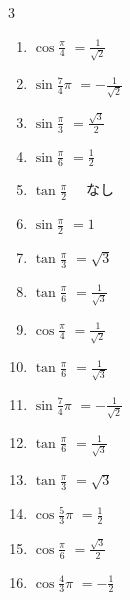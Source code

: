 \begin{multicols}{3}
\begin{enumerate}
  \item $\displaystyle \cos{\frac{\pi}{4}}$
        $\displaystyle =\frac{1}{\sqrt{2}}$

  \item $\displaystyle \sin{\frac{7}{4}\pi}$
        $\displaystyle =-\frac{1}{\sqrt{2}}$

  \item $\displaystyle \sin{\frac{\pi}{3}}$
        $\displaystyle =\frac{\sqrt{3}}{2}$

  \item $\displaystyle \sin{\frac{\pi}{6}}$
        $\displaystyle =\frac{1}{2}$

  \item $\displaystyle \tan{\frac{\pi}{2}}$
        $\displaystyle \quad なし$

  \item $\displaystyle \sin{\frac{\pi}{2}}$
        $\displaystyle =1$

  \item $\displaystyle \tan{\frac{\pi}{3}}$
        $\displaystyle =\sqrt{3}$

  \item $\displaystyle \tan{\frac{\pi}{6}}$
        $\displaystyle =\frac{1}{\sqrt{3}}$

  \item $\displaystyle \cos{\frac{\pi}{4}}$
        $\displaystyle =\frac{1}{\sqrt{2}}$

  \item $\displaystyle \tan{\frac{\pi}{6}}$
        $\displaystyle =\frac{1}{\sqrt{3}}$

  \item $\displaystyle \sin{\frac{7}{4}\pi}$
        $\displaystyle =-\frac{1}{\sqrt{2}}$

  \item $\displaystyle \tan{\frac{\pi}{6}}$
        $\displaystyle =\frac{1}{\sqrt{3}}$

  \item $\displaystyle \tan{\frac{\pi}{3}}$
        $\displaystyle =\sqrt{3}$

  \item $\displaystyle \cos{\frac{5}{3}\pi}$
        $\displaystyle =\frac{1}{2}$

  \item $\displaystyle \cos{\frac{\pi}{6}}$
        $\displaystyle =\frac{\sqrt{3}}{2}$

  \item $\displaystyle \cos{\frac{4}{3}\pi}$
        $\displaystyle =-\frac{1}{2}$


\end{enumerate}
\end{multicols}
